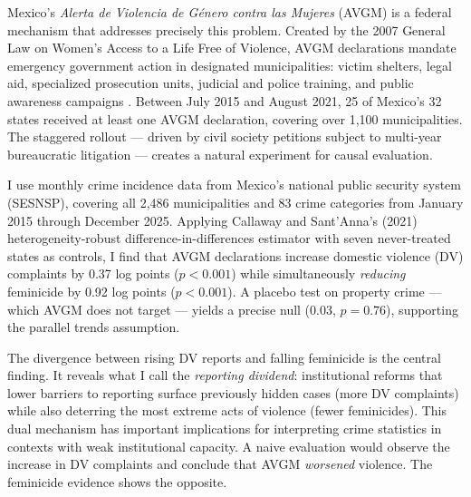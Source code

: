 \documentclass[12pt]{article}
\begin{document}
Mexico's \textit{Alerta de Violencia de G\'enero contra las Mujeres} (AVGM) is a federal mechanism that addresses precisely this problem. Created by the 2007 General Law on Women's Access to a Life Free of Violence, AVGM declarations mandate emergency government action in designated municipalities: victim shelters, legal aid, specialized prosecution units, judicial and police training, and public awareness campaigns \citep{conavim2015, inchaustegui_lopez2012}. Between July 2015 and August 2021, 25 of Mexico's 32 states received at least one AVGM declaration, covering over 1,100 municipalities. The staggered rollout --- driven by civil society petitions subject to multi-year bureaucratic litigation --- creates a natural experiment for causal evaluation.

I use monthly crime incidence data from Mexico's national public security system (SESNSP), covering all 2,486 municipalities and 83 crime categories from January 2015 through December 2025. Applying Callaway and Sant'Anna's (2021) heterogeneity-robust difference-in-differences estimator with seven never-treated states as controls, I find that AVGM declarations increase domestic violence (DV) complaints by 0.37 log points ($p < 0.001$) while simultaneously \textit{reducing} feminicide by 0.92 log points ($p < 0.001$). A placebo test on property crime --- which AVGM does not target --- yields a precise null (0.03, $p = 0.76$), supporting the parallel trends assumption.

The divergence between rising DV reports and falling feminicide is the central finding. It reveals what I call the \textit{reporting dividend}: institutional reforms that lower barriers to reporting surface previously hidden cases (more DV complaints) while also deterring the most extreme acts of violence (fewer feminicides). This dual mechanism has important implications for interpreting crime statistics in contexts with weak institutional capacity. A naive evaluation would observe the increase in DV complaints and conclude that AVGM \textit{worsened} violence. The feminicide evidence shows the opposite.
\end{document}
